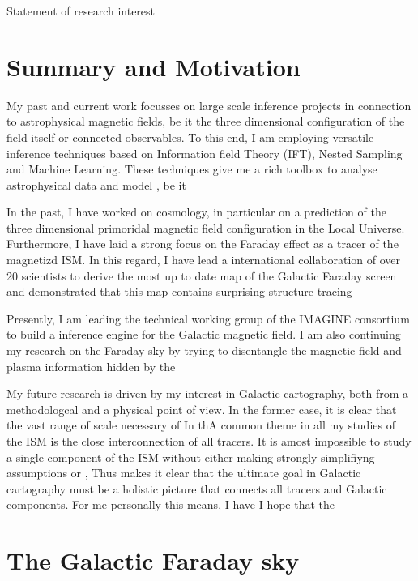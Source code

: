 \begin{center}
\Huge{Statement of research interest}
\end{center}

\section{Summary and Motivation}

My past and current work focusses on large scale inference projects in connection to astrophysical magnetic fields, be it the three dimensional configuration of the field itself or connected observables.
To this end, I am employing versatile inference techniques based on Information field Theory (IFT), Nested Sampling and Machine Learning.
These techniques give me a rich toolbox to analyse astrophysical data and model , be it   \par
In the past, I have worked on cosmology, in particular on a prediction of the three dimensional primoridal magnetic field configuration in the Local Universe.
Furthermore, I have laid a strong focus on the Faraday effect as a tracer of the magnetizd ISM.
In this regard, I have lead a international collaboration of over 20 scientists to derive the most up to date map of the Galactic Faraday screen and demonstrated that this map contains surprising structure tracing   \par
Presently, I am leading the technical working group of the IMAGINE consortium to build a inference engine for the Galactic magnetic field.
I am also continuing my research on the Faraday sky by trying to disentangle the magnetic field and plasma information hidden by the
\par
My future research is driven by my interest in Galactic cartography, both from a methodologcal and a physical point of view.
In the former case, it is clear that the vast range of scale necessary of
In thA common theme in all my studies of the ISM is the close interconnection of all tracers.
It is amost impossible to study a single component of the ISM without either making strongly simplifiyng assumptions or ,
Thus makes it clear that the ultimate goal in Galactic cartography must be a holistic picture that connects all tracers and Galactic components.
For me personally this means, I have
I hope that the

\section{The Galactic Faraday sky}

